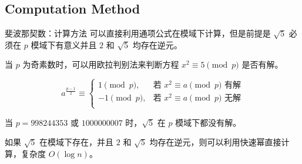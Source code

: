 \documentclass[12pt,aspectratio=169,handout]{beamer}
\begin{document}




\subsection[计算方法]{Computation Method}

\begin{frame}[fragile]{斐波那契数：计算方法}
可以直接利用通项公式在模域下计算，但是前提是 $\sqrt{5}$ 必须在 $p$ 模域下有意义并且 $2$ 和 $\sqrt{5}$ 均存在逆元。

当 $p$ 为奇素数时，可以用欧拉判别法来判断方程 $x^2 \equiv 5 \pmod p$ 是否有解。

$$
a^{\frac{p-1}{2}} \equiv \begin{cases}
  1 \pmod p, & \text{若 } x^2 \equiv a \pmod p \text{ 有解} \\
 -1 \pmod p, & \text{若 } x^2 \equiv a \pmod p \text{ 无解} \\
\end{cases}
$$

当 $p = 998244353$ 或 $1000000007$ 时，$\sqrt{5}$ 在 $p$ 模域下都没有解。

如果 $\sqrt{5}$ 在模域下存在，并且 $2$ 和 $\sqrt{5}$ 均存在逆元，则可以利用快速幂直接计算，复杂度 $O(\log n)$。
\end{frame}
\end{document}
